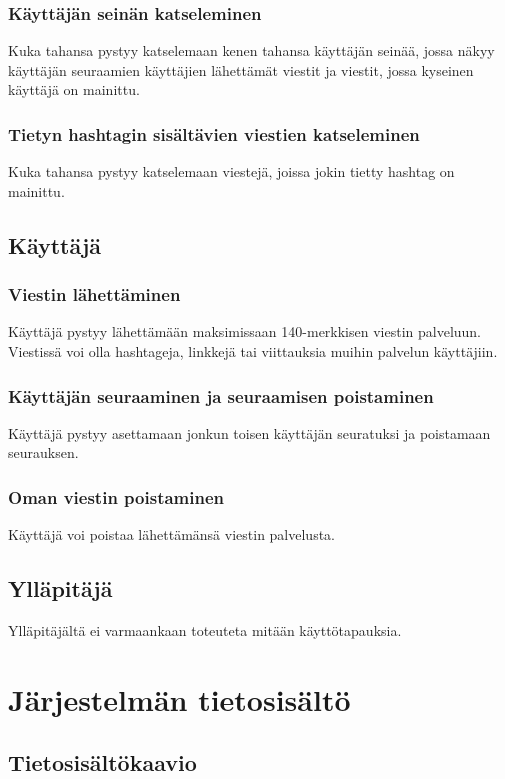 \documentclass{article}
\let\stdsection\section
\renewcommand\section{\newpage\stdsection}
\begin{document}
\subsubsection{Käyttäjän seinän katseleminen}
Kuka tahansa pystyy katselemaan kenen tahansa käyttäjän seinää, jossa näkyy käyttäjän seuraamien käyttäjien lähettämät viestit ja viestit, jossa kyseinen käyttäjä on mainittu.

\subsubsection{Tietyn hashtagin sisältävien viestien katseleminen}
Kuka tahansa pystyy katselemaan viestejä, joissa jokin tietty hashtag on mainittu.

\subsection{Käyttäjä}

\subsubsection{Viestin lähettäminen}
Käyttäjä pystyy lähettämään maksimissaan 140-merkkisen viestin palveluun. Viestissä voi olla hashtageja, linkkejä tai viittauksia muihin palvelun käyttäjiin.

\subsubsection{Käyttäjän seuraaminen ja seuraamisen poistaminen}
Käyttäjä pystyy asettamaan jonkun toisen käyttäjän seuratuksi ja poistamaan seurauksen.

\subsubsection{Oman viestin poistaminen}
Käyttäjä voi poistaa lähettämänsä viestin palvelusta.

\subsection{Ylläpitäjä}
Ylläpitäjältä ei varmaankaan toteuteta mitään käyttötapauksia.

\section{Järjestelmän tietosisältö}

\subsection{Tietosisältökaavio}
\end{document}
